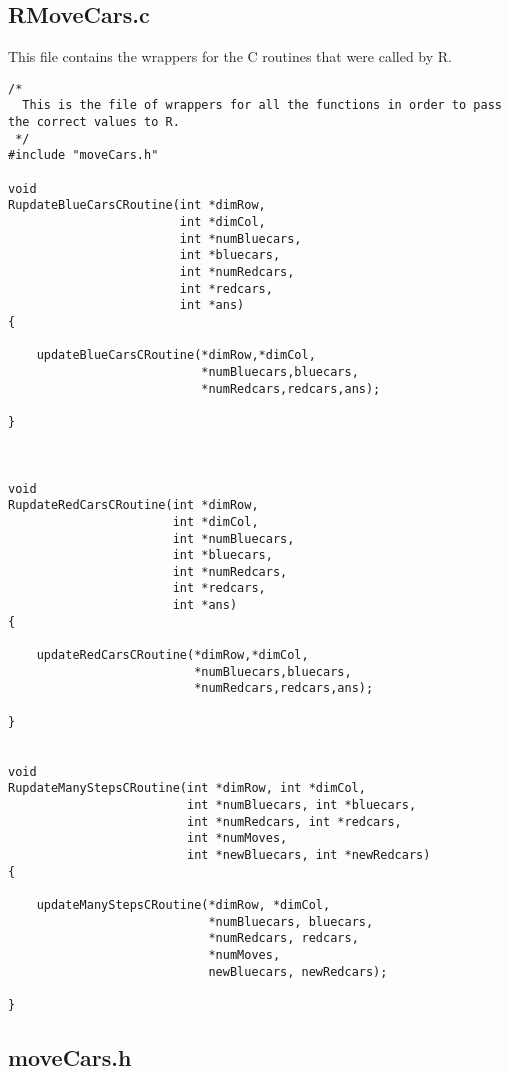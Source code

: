 \documentclass[11pt]{article}
\begin{document}
\subsection{RMoveCars.c}
\label{sec-4-2}

   This file contains the wrappers for the C routines that were called
   by R.

\begin{verbatim}
/*
  This is the file of wrappers for all the functions in order to pass the correct values to R.
 */
#include "moveCars.h"

void
RupdateBlueCarsCRoutine(int *dimRow, 
                        int *dimCol,
                        int *numBluecars,
                        int *bluecars,
                        int *numRedcars,
                        int *redcars,
                        int *ans)
{

    updateBlueCarsCRoutine(*dimRow,*dimCol,
                           *numBluecars,bluecars,
                           *numRedcars,redcars,ans);

}



void 
RupdateRedCarsCRoutine(int *dimRow,
                       int *dimCol,
                       int *numBluecars,
                       int *bluecars,
                       int *numRedcars,
                       int *redcars,
                       int *ans)
{

    updateRedCarsCRoutine(*dimRow,*dimCol,
                          *numBluecars,bluecars,
                          *numRedcars,redcars,ans);

}


void
RupdateManyStepsCRoutine(int *dimRow, int *dimCol,
                         int *numBluecars, int *bluecars,
                         int *numRedcars, int *redcars,
                         int *numMoves,
                         int *newBluecars, int *newRedcars)
{

    updateManyStepsCRoutine(*dimRow, *dimCol,
                            *numBluecars, bluecars,
                            *numRedcars, redcars,
                            *numMoves,
                            newBluecars, newRedcars);

}
\end{verbatim}
\subsection{moveCars.h}
\label{sec-4-3}
\end{document}
